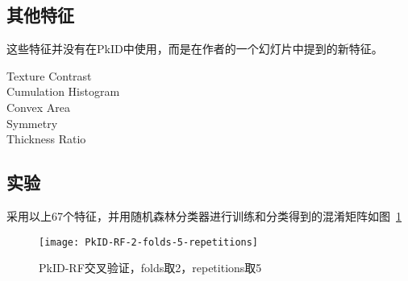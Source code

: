 \subsection{其他特征}
这些特征并没有在PkID中使用，而是在作者的一个幻灯片中提到的新特征。
\begin{description}
\item[Texture Contrast] 
\item[Cumulation Histogram]
\item[Convex Area]
\item[Symmetry]
\item[Thickness Ratio]
\end{description}


\subsection{实验}

采用以上67个特征，并用随机森林分类器进行训练和分类得到的混淆矩阵如图~\ref{fig: PkID-RF-2-folds-5-repetitions}

\begin{figure}[!ht]
\centering
\texttt{[image: PkID-RF-2-folds-5-repetitions]}
\caption{PkID-RF交叉验证，folds取2，repetitions取5}
\label{fig: PkID-RF-2-folds-5-repetitions}
\end{figure}




